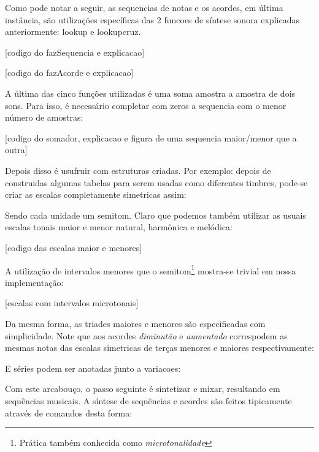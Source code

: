 Como pode notar a seguir, as sequencias de notas e os acordes, em última instância, são utilizações específicas
das 2 funcoes de síntese sonora explicadas anteriormente: lookup e lookupcruz.

[codigo do fazSequencia e explicacao]

[codigo do fazAcorde e explicacao]

A última das cinco funções utilizadas é uma soma amostra a amostra de dois sons. Para isso,
é necessário completar com zeros a sequencia com o menor número de amostras:

[codigo do somador, explicacao e figura de uma sequencia maior/menor que a outra]

Depois disso é usufruir com estruturas criadas. Por exemplo: depois de construidas
algumas tabelas para serem usadas como diferentes timbres, pode-se criar as
escalas completamente simetricas assim:


% 

Sendo cada unidade um semitom. Claro que podemos também utilizar as usuais
escalas tonais maior e menor natural, harmônica e melódica:

[codigo das escalas maior e menores]

A utilização de intervalos menores que o semitom\footnote{Prática também conhecida
como \emph{microtonalidade}} mostra-se trivial em
nossa implementação:

[escalas com intervalos microtonais]

Da mesma forma, as triades maiores e menores
são especificadas com simplicidade. Note que aos acordes \emph{diminutão} e
\emph{aumentado} correspodem as mesmas notas das escalas simetricas de terças menores
e maiores respectivamente:



E séries podem ser anotadas junto a variacoes:


Com este arcabouço, o passo seguinte é sintetizar e mixar, resultando
em sequências musicais. A síntese de sequências e acordes são feitos tipicamente
através de comandos desta forma:


